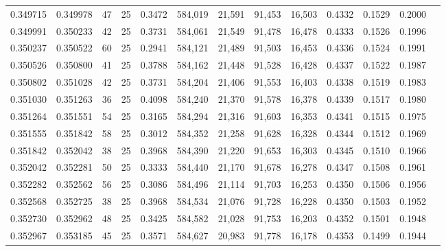 \begin{tabular}{rrrrrrrrrrrrr}
0.349715 & 0.349978 &    47 &  25 &                                     0.3472 & 584,019 &  21,591 &  91,453 &  16,503 & 0.4332 & 0.1529 & 0.2000 \\
0.349991 & 0.350233 &    42 &  25 &                                     0.3731 & 584,061 &  21,549 &  91,478 &  16,478 & 0.4333 & 0.1526 & 0.1996 \\
0.350237 & 0.350522 &    60 &  25 &                                     0.2941 & 584,121 &  21,489 &  91,503 &  16,453 & 0.4336 & 0.1524 & 0.1991 \\
0.350526 & 0.350800 &    41 &  25 &                                     0.3788 & 584,162 &  21,448 &  91,528 &  16,428 & 0.4337 & 0.1522 & 0.1987 \\
0.350802 & 0.351028 &    42 &  25 &                                     0.3731 & 584,204 &  21,406 &  91,553 &  16,403 & 0.4338 & 0.1519 & 0.1983 \\
0.351030 & 0.351263 &    36 &  25 &                                     0.4098 & 584,240 &  21,370 &  91,578 &  16,378 & 0.4339 & 0.1517 & 0.1980 \\
0.351264 & 0.351551 &    54 &  25 &                                     0.3165 & 584,294 &  21,316 &  91,603 &  16,353 & 0.4341 & 0.1515 & 0.1975 \\
0.351555 & 0.351842 &    58 &  25 &                                     0.3012 & 584,352 &  21,258 &  91,628 &  16,328 & 0.4344 & 0.1512 & 0.1969 \\
0.351842 & 0.352042 &    38 &  25 &                                     0.3968 & 584,390 &  21,220 &  91,653 &  16,303 & 0.4345 & 0.1510 & 0.1966 \\
0.352042 & 0.352281 &    50 &  25 &                                     0.3333 & 584,440 &  21,170 &  91,678 &  16,278 & 0.4347 & 0.1508 & 0.1961 \\
0.352282 & 0.352562 &    56 &  25 &                                     0.3086 & 584,496 &  21,114 &  91,703 &  16,253 & 0.4350 & 0.1506 & 0.1956 \\
0.352568 & 0.352725 &    38 &  25 &                                     0.3968 & 584,534 &  21,076 &  91,728 &  16,228 & 0.4350 & 0.1503 & 0.1952 \\
0.352730 & 0.352962 &    48 &  25 &                                     0.3425 & 584,582 &  21,028 &  91,753 &  16,203 & 0.4352 & 0.1501 & 0.1948 \\
0.352967 & 0.353185 &    45 &  25 &                                     0.3571 & 584,627 &  20,983 &  91,778 &  16,178 & 0.4353 & 0.1499 & 0.1944 \\

\end{tabular}

